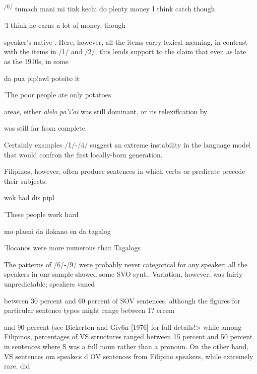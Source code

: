\textsuperscript{/6/ }tumach mani mi tink kechi do plenty money I think catch though

'I think he earns a lot of money, though

speaker's native . Here, however, all the  items carry lexical meaning, in contrast with the  items in /1/ and /2/; this lends support to the claim that even as late as the 1910s, in some

\ea\label{ex:7}

\glt
\z

da pua pip!awl poteito it

'The poor people ate only potatoes

areas, either \textit{olelo} \textit{pa'i'ai }was still dominant, or its relexiflcation by

 was still far from complete.

Certainly examples /1/-/4/ suggest an extreme instability in the language model that would confron the first locally-born generation.

Filipinos, however, often produce sentences in which verbs or predicate  precede their subjects:

\ea\label{ex:8}
 wok had dis pipl
\glt
\z

'These people work hard


\ea\label{ex:9}
mo plaeni da ilokano en da tagalog
\glt
\z

'Ilocanos were more numerous than Tagalogs

The patterns of /6/-/9/ were probably never categorical for any speaker; all the speakers in onr sample showed some SVO synt.{\textquotedbl}{\textquotedbl}. Variation, however, was fairly unpredictable;  speakers vaned

between 30 percent and 60 percent of SOV sentences, although the figures for particular sentence types might range between 1? ercem

and 90 percent (see Bickerton and Giv6n [1976] for full details!{\textgreater} while among Filipinos, percentages of VS structures ranged between 15 percent and 50 percent in sentences where S was a full noun rather than a pronoun. On the other hand, VS sentences om  speake:s d OV sentences from Filipino speakers, while extremely rare, did

